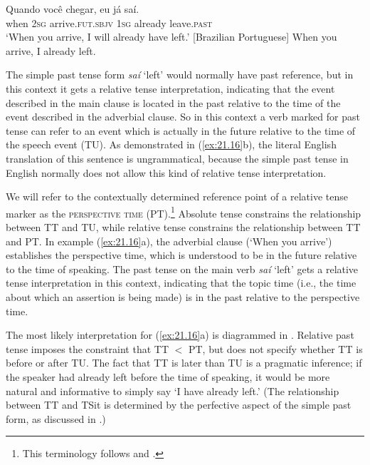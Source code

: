 \ea \label{ex:21.16}
\ea  \gll Quando  você  chegar, eu  já  saí.\\
when  \textsc{2sg}  arrive.\textsc{fut.sbjv}  \textsc{1sg}  already  leave.\textsc{past}\\
\glt ‘When you arrive, I will already have left.’   [{Brazilian} {Portuguese}]
\ex   *When you arrive, I already left.
\z 
\z



The simple past tense form \textit{saí} ‘left’ would normally have past reference, but in this context it gets a relative tense interpretation, indicating that the event described in the main clause is located in the past relative to the time of the event described in the adverbial clause. So in this context a verb marked for past tense can refer to an event which is actually in the future relative to the time of the speech event (TU). As demonstrated in (\ref{ex:21.16}b), the literal English translation of this sentence is ungrammatical, because the simple past tense in English normally does not allow this kind of relative tense interpretation.



We will refer to the contextually determined reference point of a relative tense marker as the \textsc{perspective time} (PT).\footnote{This terminology follows \citet{Kiparsky2002} and \citet{Bohnemeyer2014}.} Absolute tense constrains the relationship between TT and TU, while relative tense constrains the relationship between TT and PT. In example (\ref{ex:21.16}a), the adverbial clause (‘When you arrive’) establishes the perspective time, which is understood to be in the future relative to the time of speaking. The past tense on the main verb \textit{saí} ‘left’ gets a relative tense interpretation in this context, indicating that the topic time (i.e., the time about which an assertion is being made) is in the past relative to the perspective time.



The most likely interpretation for (\ref{ex:21.16}a) is diagrammed in . Relative past tense imposes the constraint that TT {$<$} PT, but does not specify whether TT is before or after TU. The fact that TT is later than TU is a pragmatic inference; if the speaker had already left before the time of speaking, it would be more natural and informative to simply say ‘I have already left.’ (The relationship between TT and TSit is determined by the perfective aspect of the simple past form, as discussed in .)


